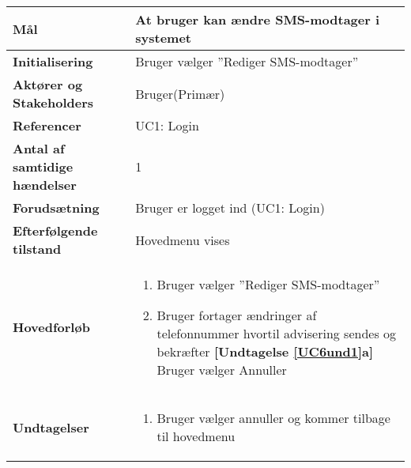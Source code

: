 \begin{table}[H] \centering
\begin{tabular}{|p{6cm}|p{8cm}|}
	\hline
\textbf{Mål} &
At bruger kan ændre SMS-modtager i systemet\\\hline

\textbf{Initialisering} &
Bruger vælger ''Rediger SMS-modtager'' \\\hline
 
\textbf{Aktører og Stakeholders} &
Bruger(Primær) \\\hline

\textbf{Referencer} &
UC1: Login  \\\hline

\textbf{Antal af samtidige hændelser} &
1  \\\hline

\textbf{Forudsætning} &
Bruger er logget ind (UC1: Login)\\\hline

\textbf{Efterfølgende tilstand} &
Hovedmenu vises  \\\hline

\textbf{Hovedforløb} &
\begin{enumerate}

\item Bruger vælger ''Rediger SMS-modtager''
\item \label{UC6und1}Bruger fortager ændringer af telefonnummer hvortil advisering sendes og bekræfter \newline
\textbf{[Undtagelse \ref{UC6und1}a]} Bruger vælger Annuller

\end{enumerate}   
 \\\hline
 
\textbf{Undtagelser}
&\begin{enumerate}[label= \ref{UC6und1}a.]
\item Bruger vælger annuller og kommer tilbage til hovedmenu
\end{enumerate}
 \\\hline
 

	\end{tabular}
	\label{UC6} 
\end{table}